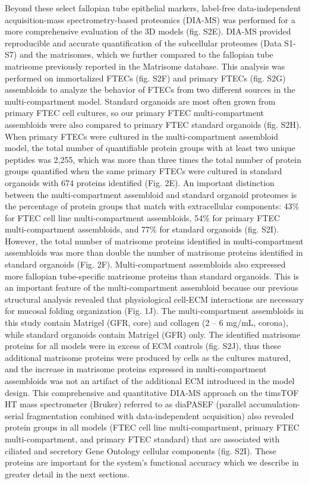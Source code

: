 \begin{refsection}
    Beyond these select fallopian tube epithelial markers, label-free data-independent acquisition-mass spectrometry-based proteomics (DIA-MS)\cite{gillet2012a,collins2017a,bons2023a,meier2020a} was performed for a more comprehensive evaluation of the 3D models (fig. S2E). DIA-MS provided reproducible and accurate quantification of the subcellular proteomes (Data S1-S7)\cite{burton2022a,thul1979a} and the matrisomes\cite{bons2023a}, which we further compared to the fallopian tube matrisome previously reported in the Matrisome database\cite{shao2023a}. This analysis was performed on immortalized FTECs (fig. S2F) and primary FTECs (fig. S2G) assembloids to analyze the behavior of FTECs from two different sources in the multi-compartment model. Standard organoids are most often grown from primary FTEC cell cultures\cite{kessler2015a,clevers2016a}, so our primary FTEC multi-compartment assembloids were also compared to primary FTEC standard organoids (fig. S2H). When primary FTECs were cultured in the multi-compartment assembloid model, the total number of quantifiable protein groups with at least two unique peptides was 2,255, which was more than three times the total number of protein groups quantified when the same primary FTECs were cultured in standard organoids with 674 proteins identified (Fig. 2E). An important distinction between the multi-compartment assembloid and standard organoid proteomes is the percentage of protein groups that match with extracellular components: 43\% for FTEC cell line multi-compartment assembloids, 54\% for primary FTEC multi-compartment assembloids, and 77\% for standard organoids (fig. S2I). However, the total number of matrisome proteins identified in multi-compartment assembloids was more than double the number of matrisome proteins identified in standard organoids\cite{shao2023a} (Fig. 2F). 
    Multi-compartment assembloids also expressed more fallopian tube-specific matrisome proteins than standard organoids. This is an important feature of the multi-compartment assembloid because our previous structural analysis revealed that physiological cell-ECM interactions are necessary for mucosal folding organization (Fig. 1J). The multi-compartment assembloids in this study contain Matrigel (GFR, core) and collagen (2 – 6 mg/mL, corona), while standard organoids contain Matrigel (GFR) only. The identified matrisome proteins for all models were in excess of ECM controls (fig. S2J), thus these additional matrisome proteins were produced by cells as the cultures matured, and the increase in matrisome proteins expressed in multi-compartment assembloids was not an artifact of the additional ECM introduced in the model design.
    This comprehensive and quantitative DIA-MS approach on the timsTOF HT mass spectrometer (Bruker) referred to as diaPASEF (parallel accumulation-serial fragmentation combined with data-independent acquisition)\cite{meier2020a} also revealed protein groups in all models (FTEC cell line multi-compartment, primary FTEC multi-compartment, and primary FTEC standard) that are associated with ciliated and secretory Gene Ontology\cite{ashburner2000a,aleksander2023a} cellular components (fig. S2I). These proteins are important for the system’s functional accuracy which we describe in greater detail in the next sections. 


\end{refsection}
